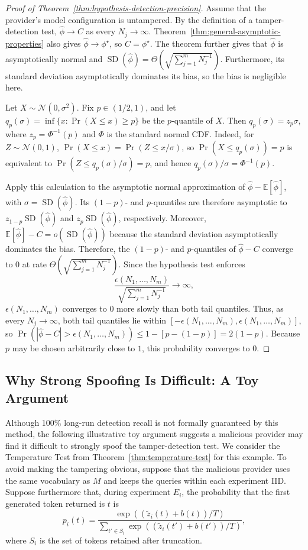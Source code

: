 \documentclass{article}
\begin{document}
\begin{proof}[Proof of Theorem~\ref{thm:hypothesis-detection-precision}]
Assume that the provider's model configuration is untampered. By the definition
of a tamper-detection test, $\widehat{\phi}\to C$ as every $N_j\to\infty$.
Theorem~\ref{thm:general-asymptotic-properties} also gives
$\widehat{\phi}\to\phi^\star$, so $C=\phi^\star$. The theorem further gives
that $\widehat{\phi}$ is asymptotically normal and
$\operatorname{SD}(\widehat{\phi})=
\Theta(\sqrt{\sum_{j=1}^m N_j^{-1}})$. Furthermore, its standard deviation
asymptotically dominates its bias, so the bias is negligible here.

Let $X\sim\mathcal{N}(0,\sigma^2)$. Fix $p\in(1/2,1)$, and let
$q_p(\sigma)=\inf\{x:\Pr(X\leq x)\geq p\}$ be the $p$-quantile of $X$.
Then $q_p(\sigma)=z_p\sigma$, where $z_p=\Phi^{-1}(p)$ and $\Phi$ is the
standard normal CDF. Indeed, for $Z\sim\mathcal{N}(0,1)$,
$\Pr(X\leq x)=\Pr(Z\leq x/\sigma)$, so
$\Pr(X\leq q_p(\sigma))=p$ is equivalent to
$\Pr(Z\leq q_p(\sigma)/\sigma)=p$, and hence
$q_p(\sigma)/\sigma=\Phi^{-1}(p)$.

Apply this calculation to the asymptotic normal approximation of
$\widehat{\phi}-\mathbb{E}[\widehat{\phi}]$, with
$\sigma=\operatorname{SD}(\widehat{\phi})$. Its $(1-p)$- and $p$-quantiles
are therefore asymptotic to
$z_{1-p}\operatorname{SD}(\widehat{\phi})$ and
$z_p\operatorname{SD}(\widehat{\phi})$, respectively. Moreover,
$\mathbb{E}[\widehat{\phi}]-C=o(\operatorname{SD}(\widehat{\phi}))$ because
the standard deviation asymptotically dominates the bias. Therefore, the
$(1-p)$- and $p$-quantiles of $\widehat{\phi}-C$ converge to $0$ at rate
$\Theta(\sqrt{\sum_{j=1}^m N_j^{-1}})$. Since the hypothesis test enforces
\[
\frac{\epsilon(N_1,\ldots,N_m)}
{\sqrt{\sum_{j=1}^m N_j^{-1}}}\to\infty,
\]
$\epsilon(N_1,\ldots,N_m)$ converges to $0$ more slowly than both tail
quantiles. Thus, as every $N_j\to\infty$, both tail quantiles lie within
$[-\epsilon(N_1,\ldots,N_m),\epsilon(N_1,\ldots,N_m)]$, so
$\Pr(|\widehat{\phi}-C|>\epsilon(N_1,\ldots,N_m))
\leq 1-[p-(1-p)]=2(1-p)$. Because $p$ may be chosen arbitrarily close to
$1$, this probability converges to $0$.
\end{proof}

\subsection{Why Strong Spoofing Is Difficult: A Toy Argument}
\label{app:toy-spoofing}

Although 100\% long-run detection recall is not formally guaranteed by this
method, the following illustrative toy argument suggests a malicious
provider may find it difficult to strongly spoof the tamper-detection test. We
consider the Temperature Test from Theorem~\ref{thm:temperature-test} for this example. To avoid
making the tampering obvious, suppose that the malicious provider uses the same
vocabulary as $M$ and keeps the queries within each experiment IID. Suppose furthermore
that, during experiment $E_i$, the
probability that the first generated token returned is $t$ is
\[
p_i(t)=\frac{\exp((\widetilde{z}_i(t)+b(t))/T)}
{\sum_{t'\in S_i}\exp((\widetilde{z}_i(t')+b(t'))/T)},
\]
where $S_i$ is the set of tokens retained after truncation.
\end{document}
